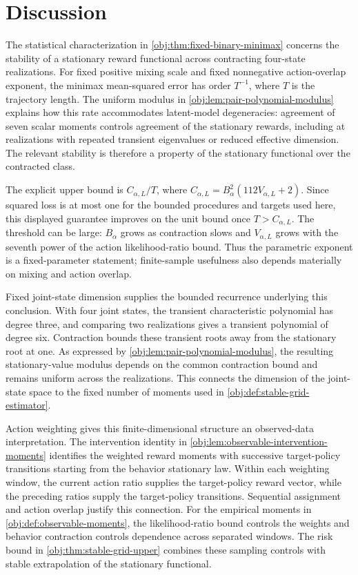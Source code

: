 \documentclass[11pt]{article}
\begin{document}
\section{Discussion}

The statistical characterization in \cref{obj:thm:fixed-binary-minimax} concerns the stability of a stationary reward functional across contracting four-state realizations. For fixed positive mixing scale and fixed nonnegative action-overlap exponent, the minimax mean-squared error has order \(T^{-1}\), where \(T\) is the trajectory length. The uniform modulus in \cref{obj:lem:pair-polynomial-modulus} explains how this rate accommodates latent-model degeneracies: agreement of seven scalar moments controls agreement of the stationary rewards, including at realizations with repeated transient eigenvalues or reduced effective dimension. The relevant stability is therefore a property of the stationary functional over the contracted class.

The explicit upper bound is \(C_{\alpha,L}/T\), where \(C_{\alpha,L}=B_\alpha^2(112V_{\alpha,L}+2)\). Since squared loss is at most one for the bounded procedures and targets used here, this displayed guarantee improves on the unit bound once \(T>C_{\alpha,L}\). The threshold can be large: \(B_\alpha\) grows as contraction slows and \(V_{\alpha,L}\) grows with the seventh power of the action likelihood-ratio bound. Thus the parametric exponent is a fixed-parameter statement; finite-sample usefulness also depends materially on mixing and action overlap.

Fixed joint-state dimension supplies the bounded recurrence underlying this conclusion. With four joint states, the transient characteristic polynomial has degree three, and comparing two realizations gives a transient polynomial of degree six. Contraction bounds these transient roots away from the stationary root at one. As expressed by \cref{obj:lem:pair-polynomial-modulus}, the resulting stationary-value modulus depends on the common contraction bound and remains uniform across the realizations. This connects the dimension of the joint-state space to the fixed number of moments used in \cref{obj:def:stable-grid-estimator}.

Action weighting gives this finite-dimensional structure an observed-data interpretation. The intervention identity in \cref{obj:lem:observable-intervention-moments} identifies the weighted reward moments with successive target-policy transitions starting from the behavior stationary law. Within each weighting window, the current action ratio supplies the target-policy reward vector, while the preceding ratios supply the target-policy transitions. Sequential assignment and action overlap justify this connection. For the empirical moments in \cref{obj:def:observable-moments}, the likelihood-ratio bound controls the weights and behavior contraction controls dependence across separated windows. The risk bound in \cref{obj:thm:stable-grid-upper} combines these sampling controls with stable extrapolation of the stationary functional.
\end{document}
